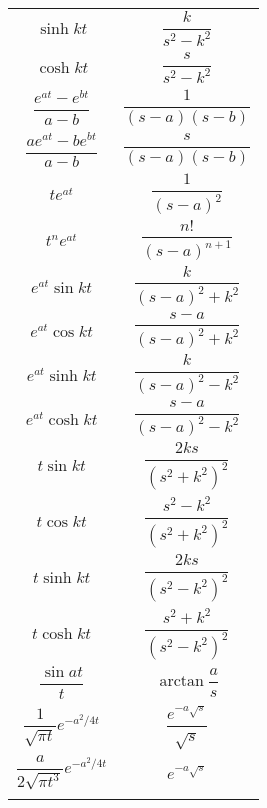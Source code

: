 \documentclass[a4paper, 10pt, ]{article}
\begin{document}
\begin{longtable}{cc}
        $\sinh kt$	                            & $\dfrac{k}{s^2-k^2}$                                   \\ \addlinespace[3mm]
        $\cosh kt$	                            & $\dfrac{s}{s^2-k^2}$                                   \\ \addlinespace[3mm]
        $\dfrac{e^{at}-e^{bt}}{a-b}$	        & $\dfrac{1}{(s-a)(s-b)}$                                  \\ \addlinespace[3mm]
        $\dfrac{ae^{at}-be^{bt}}{a-b}$	        & $\dfrac{s}{(s-a)(s-b)}$                                \\ \addlinespace[3mm]
        $te^{at}$	                            & $\dfrac{1}{(s-a)^2}$	                                   \\ \addlinespace[3mm]
        $t^ne^{at}$	                            & $\dfrac{n!}{(s-a)^{n+1}}$	                                \\ \addlinespace[3mm]
        $e^{at}\sin kt$	                        & $\dfrac{k}{(s-a)^2+k^2}$                                  \\ \addlinespace[3mm]
        $e^{at}\cos kt$	                        & $\dfrac{s-a}{(s-a)^2+k^2}$                                \\ \addlinespace[3mm]
        $e^{at}\sinh kt$	                    & $\dfrac{k}{(s-a)^2-k^2}$                                 \\ \addlinespace[3mm]
        $e^{at}\cosh kt$	                    & $\dfrac{s-a}{(s-a)^2-k^2}$                               \\ \addlinespace[3mm]
        $t\sin kt$  	                        & $\dfrac{2ks}{(s^2+k^2)^2}$                               \\ \addlinespace[3mm]
        $t\cos kt$  	                        & $\dfrac{s^2-k^2}{(s^2+k^2)^2}$                           \\ \addlinespace[3mm]
        $t\sinh kt$  	                        & $\dfrac{2ks}{(s^2-k^2)^2}$                              \\ \addlinespace[3mm]
        $t\cosh kt$  	                        & $\dfrac{s^2+k^2}{(s^2-k^2)^2}$                          \\ \addlinespace[3mm]
        $\dfrac{\sin at}{t}$	                & $\arctan \dfrac{a}{s}$                                   \\ \addlinespace[3mm]
        $\dfrac{1}{\sqrt{\pi t}}e^{-a^2/4t}$	& $\dfrac{e^{-a\sqrt{s}}}{\sqrt{s}}$                           \\ \addlinespace[3mm]
        $\dfrac{a}{2\sqrt{\pi t^3}}e^{-a^2/4t}$	& $e^{-a\sqrt{s}}$                                      \\ \addlinespace[3mm]


    \end{longtable}
\end{document}
